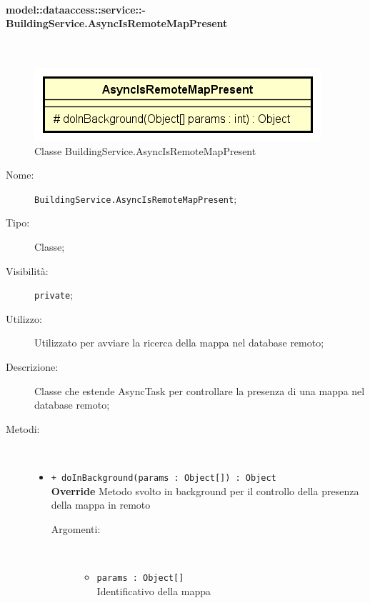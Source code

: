 \documentclass[../DefinizioneDiProdotto.tex]{subfiles}
\begin{document}
\paragraph{model::dataaccess::service::-\\BuildingService.AsyncIsRemoteMapPresent}
\
\begin{figure}[H]
	\centering
	\includegraphics[width=\maxwidth]{img/BuildingService-AsyncIsRemoteMapPresent.png}
	\caption{Classe BuildingService.AsyncIsRemoteMapPresent}\label{fig:model::dataaccess::service::BuildingService.AsyncIsRemoteMapPresent} 
\end{figure}
\begin{description}
	\item[Nome:] \texttt{BuildingService.AsyncIsRemoteMapPresent};
	\item[Tipo:] Classe;
	\item[Visibilità:] \texttt{private};
	\item[Utilizzo:] Utilizzato per avviare la ricerca della mappa nel database remoto;
	\item[Descrizione:] Classe che estende AsyncTask per controllare la presenza di una mappa nel database remoto;
	\item[Metodi:] \
	\begin{itemize}
		\item \texttt{+ doInBackground(params : Object[]) : Object}\\
		\textbf{Override} Metodo svolto in background per il controllo della presenza della mappa in remoto
		\begin{description}
			\item[Argomenti:] \
			\begin{itemize}
				\item \texttt{params : Object[]}\\
				Identificativo della mappa\end{itemize}
		\end{description}
	\end{itemize}
\end{description}
\end{document}
